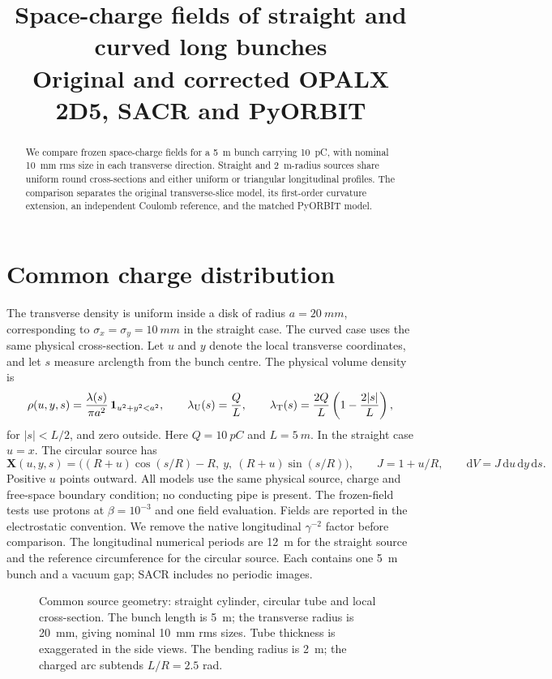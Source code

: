 \documentclass[10pt,a4paper]{article}
\title{Space-charge fields of straight and curved long bunches\\[3pt]
\large Original and corrected OPALX 2D5, SACR and PyORBIT}
\author{}
\date{}
\newcommand{\dd}{\mathrm d}
\begin{document}
\maketitle
\vspace{-2.5em}
\begin{abstract}
We compare frozen space-charge fields for a \SI{5}{m} bunch carrying
\SI{10}{pC}, with nominal \SI{10}{mm} rms size in each transverse direction.
Straight and \SI{2}{m}-radius sources share uniform round cross-sections
and either uniform or triangular longitudinal profiles. The comparison
separates the original transverse-slice model, its first-order curvature
extension, an independent Coulomb reference, and the matched PyORBIT model.
\end{abstract}

\section{Common charge distribution}
The transverse density is uniform inside a disk of radius
$a=\SI{20}{mm}$, corresponding to $\sigma_x=\sigma_y=\SI{10}{mm}$ in the
straight case. The curved case uses the same physical cross-section.
Let $u$ and $y$ denote the local
transverse coordinates, and let $s$ measure arclength from the bunch centre.
The physical volume density is
\begin{equation}
 \rho(u,y,s)=\frac{\lambda(s)}{\pi a^2}\,
 \mathbf 1_{u^2+y^2<a^2},\qquad
 \lambda_{\rm U}(s)=\frac{Q}{L},\qquad
 \lambda_{\rm T}(s)=\frac{2Q}{L}\left(1-\frac{2|s|}{L}\right),
 \label{eq:source}
\end{equation}
for $|s|<L/2$, and zero outside. Here $Q=\SI{10}{pC}$ and
$L=\SI{5}{m}$. In the straight case $u=x$. The circular source has
\begin{equation}
 \mathbf X(u,y,s)=\bigl((R+u)\cos(s/R)-R,\ y,\ (R+u)\sin(s/R)\bigr),
 \qquad J=1+u/R,\qquad \dd V=J\,\dd u\,\dd y\,\dd s.
 \label{eq:map}
\end{equation}
Positive $u$ points outward. All models use the same physical source,
charge and free-space boundary condition; no conducting pipe is present.
The frozen-field tests use protons at $\beta=10^{-3}$ and one field
evaluation. Fields are reported in the electrostatic convention.
We remove the native longitudinal $\gamma^{-2}$ factor before comparison.
The longitudinal numerical periods are \SI{12}{m} for the straight source
and the reference circumference for the circular source. Each contains
one \SI{5}{m} bunch and a vacuum gap; SACR includes no periodic images.
\begin{figure}[ht]
\centering

\caption{Common source geometry: straight cylinder, circular tube and local
cross-section. The bunch length is \SI{5}{m}; the transverse radius is
\SI{20}{mm}, giving nominal \SI{10}{mm} rms sizes. Tube thickness is exaggerated
in the side views. The bending radius is \SI{2}{m}; the charged arc subtends
$L/R=2.5$ rad.}
\label{fig:geometry}
\end{figure}
\end{document}
